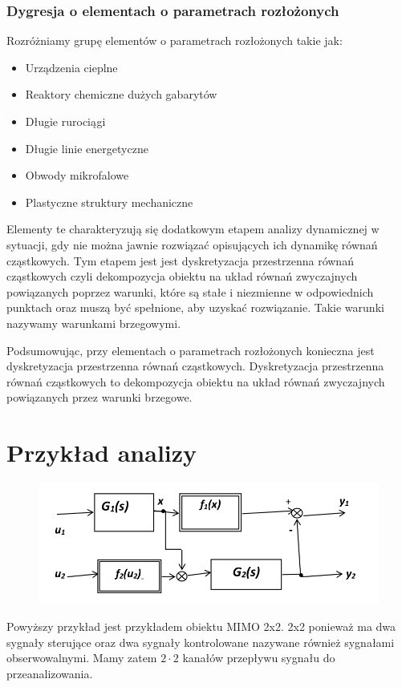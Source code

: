 \documentclass{article}
\begin{document}
		\subsubsection{Dygresja o elementach o parametrach rozłożonych}
			Rozróżniamy grupę elementów o parametrach rozłożonych takie jak:
			\begin{itemize}
				\item Urządzenia cieplne 
				\item Reaktory chemiczne dużych gabarytów
				\item Długie rurociągi
				\item Długie linie energetyczne
				\item Obwody mikrofalowe
				\item Plastyczne struktury mechaniczne
			\end{itemize}

			Elementy te charakteryzują się dodatkowym etapem analizy dynamicznej
			w sytuacji, gdy nie można jawnie rozwiązać opisujących ich dynamikę równań cząstkowych.
			Tym etapem jest jest dyskretyzacja przestrzenna równań cząstkowych czyli dekompozycja obiektu na układ równań
			zwyczajnych powiązanych poprzez warunki, które są stałe i niezmienne w odpowiednich punktach
			oraz muszą być spełnione, aby uzyskać rozwiązanie. Takie warunki nazywamy warunkami brzegowymi.

			Podsumowując, przy elementach o parametrach rozłożonych konieczna jest dyskretyzacja przestrzenna równań
			cząstkowych. Dyskretyzacja przestrzenna równań cząstkowych to dekompozycja obiektu na układ równań zwyczajnych
			powiązanych przez warunki brzegowe.
	\section{Przykład analizy}
		\begin{figure}
			\includegraphics{PrzykladDoAnalizy.png}
		\end{figure}
		Powyższy przykład jest przykładem obiektu MIMO 2x2. 2x2 ponieważ ma dwa sygnały sterujące oraz dwa 
		sygnały kontrolowane nazywane również sygnałami obserwowalnymi. Mamy zatem $ 2 \cdot 2 $ kanałów przepływu
		sygnału do przeanalizowania. 
\end{document}
